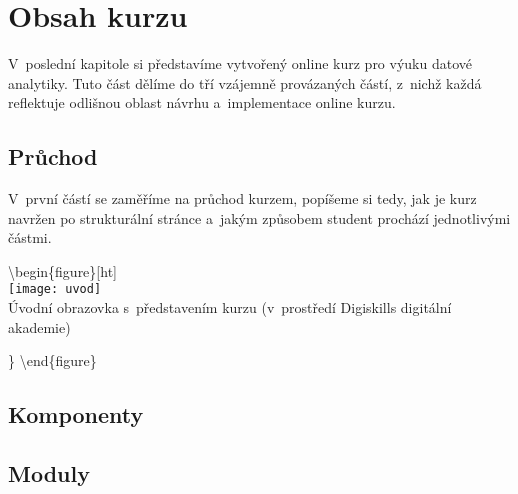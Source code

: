 \hypertarget{obsah-kurzu}{%
\chapter{Obsah kurzu}\label{obsah-kurzu}}

V~poslední kapitole si představíme vytvořený online kurz pro výuku datové analytiky. Tuto část dělíme do tří vzájemně provázaných částí, z~nichž každá reflektuje odlišnou oblast návrhu a~implementace online kurzu.

\hypertarget{prux16fchod}{%
\section{Průchod}\label{prux16fchod}}

V~první částí se zaměříme na průchod kurzem, popíšeme si tedy, jak je kurz navržen po strukturální stránce a~jakým způsobem student prochází jednotlivými částmi.

\textbackslash begin\{figure\}{[}ht{]}\\
\centering \texttt{[image: uvod]}\\

\caption{Úvodní obrazovka s~představením kurzu (v~prostředí Digiskills digitální akademie)}

\} \label{uvod} \textbackslash end\{figure\}

\hypertarget{komponenty}{%
\section{Komponenty}\label{komponenty}}

\hypertarget{moduly}{%
\section{Moduly}\label{moduly}}
